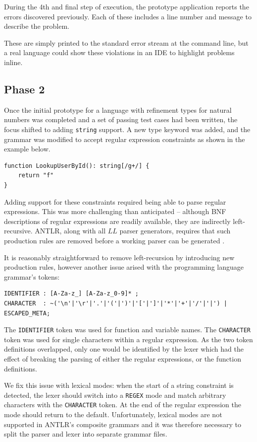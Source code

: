 \documentclass[a4paper]{article}
\begin{document}
    During the 4th and final step of execution, the prototype application reports the errors discovered previously. Each of these includes a line number and message to describe the problem.
    
    These are simply printed to the standard error stream at the command line, but a real language could show these violations in an IDE to highlight problems inline.

\subsection*{Phase 2}\hfill

Once the initial prototype for a language with refinement types for natural numbers was completed and a set of passing test cases had been written, the focus shifted to adding \texttt{string} support. A new type keyword was added, and the grammar was modified to accept regular expression constraints as shown in the example below.

\begin{verbatim}
function LookupUserById(): string[/g+/] {
    return "f"
}
\end{verbatim}

Adding support for these constraints required being able to parse regular expressions. This was more challenging than anticipated -- although BNF descriptions of regular expressions are readily available, they are indirectly left-recursive. ANTLR, along with all $LL$ parser generators, requires that such production rules are removed before a working parser can be generated \citep{dick1990parsing}.

It is reasonably straightforward to remove left-recursion by introducing new production rules, however another issue arised with the programming language grammar's tokens:

\begin{verbatim}
IDENTIFIER : [A-Za-z_] [A-Za-z_0-9]* ;
CHARACTER  : ~('\n'|'\r'|'.'|'('|')'|'['|']'|'*'|'+'|'/'|'|') | ESCAPED_META;
\end{verbatim}

The \texttt{IDENTIFIER} token was used for function and variable names. The \texttt{CHARACTER} token was used for single characters within a regular expression. As the two token definitions overlapped, only one would be identified by the lexer which had the effect of breaking the parsing of either the regular expressions, or the function definitions.

We fix this issue with lexical modes: when the start of a string constraint is detected, the lexer should switch into a \texttt{REGEX} mode and match arbitrary characters with the \texttt{CHARACTER} token. At the end of the regular expression the mode should return to the default. Unfortunately, lexical modes are not supported in ANTLR's composite grammars and it was therefore necessary to split the parser and lexer into separate grammar files.
\end{document}
